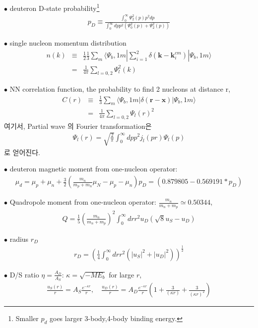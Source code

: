 \documentclass[10pt]{article}
\def\bm{\boldsymbol}
\newcommand{\bea}{\begin{eqnarray}}
\newcommand{\eea}{\end{eqnarray}}
\newcommand{\no}{\nonumber \\}
\def\vk{{\bm k}}
\def\vx{{\bm x}}
\def\vr{{\bm r}}
\def\la{\langle}
\def\ra{\rangle}
\begin{document}
$\bullet$ deuteron D-state probability\footnote{Smaller $p_d$ goes larger 3-body,4-body binding energy.}
\bea
p_D\equiv\frac{\int_0^\infty \Psi_2^2(p) p^2 dp}
                   {\int_0^\infty dp p^2 (\Psi_0^2(p)+\Psi_2^2(p))}
\eea

$\bullet$ single nucleon momentum distribution
\bea
n(k)&\equiv&\frac{1}{2}\frac{1}{3}\sum_m 
         \la \Psi_b,1 m|\sum_{i=1}^2\delta(\vk-\vk_i^{cm})|\Psi_b, 1 m\ra \no
       &=&\frac{1}{4\pi}\sum_{l=0,2}\Psi_l^2(k)
\eea

$\bullet$ NN correlation function, the probability to find 2 nucleons at distance r,
\bea
C(r)&\equiv&\frac{1}{3}\sum_m\la \Psi_b,1 m|\delta(\vr-\vx)|\Psi_b,1 m\ra\no
      &=&\frac{1}{4\pi}\sum_{l=0,2}\Psi_l(r)^2
\eea
여기서, Partial wave 의 Fourier transformation은 
\bea
\Psi_l(r)=\sqrt{\frac{2}{\pi}}\int_0^\infty dp p^2 j_l(pr)\Psi_l(p)
\eea
로 얻어진다.

$\bullet$ deuteron magnetic moment from one-nucleon operator:
\bea 
\mu_d=\mu_p+\mu_n+\frac{3}{2}\left(\frac{m_n}{m_p+m_n}\mu_N-\mu_p-\mu_n\right) p_D
     =(0.879805-0.569191*p_D)
\eea 

$\bullet$ Quadropole moment from one-nucleon operator: $\frac{m_n}{m_n+m_p}\simeq 0.50344$,
\bea 
Q=\frac{1}{5}\left(\frac{m_n}{m_n+m_p}\right)^2
  \int_0^\infty dr r^2 u_D(\sqrt{8} u_S-u_D) 
\eea 

$\bullet$ radius $r_D$
\bea
r_D=\left(\frac{1}{4}\int_0^\infty dr r^2 (|u_S|^2+|u_D|^2)  \right)^{\frac{1}{2}}
\eea 

$\bullet$ D/S ratio $\eta=\frac{A_D}{A_S}$: $\kappa=\sqrt{-M E_b}$ for large $r$,
\bea 
\frac{u_S(r)}{r}=A_S \frac{e^{-\kappa r}}{r},\quad 
\frac{u_D(r)}{r}=A_D \frac{e^{-\kappa r}}{r}
\left(1+\frac{3}{(\kappa r)}+\frac{3}{(\kappa r)^2}   \right) 
\eea 
\end{document}
